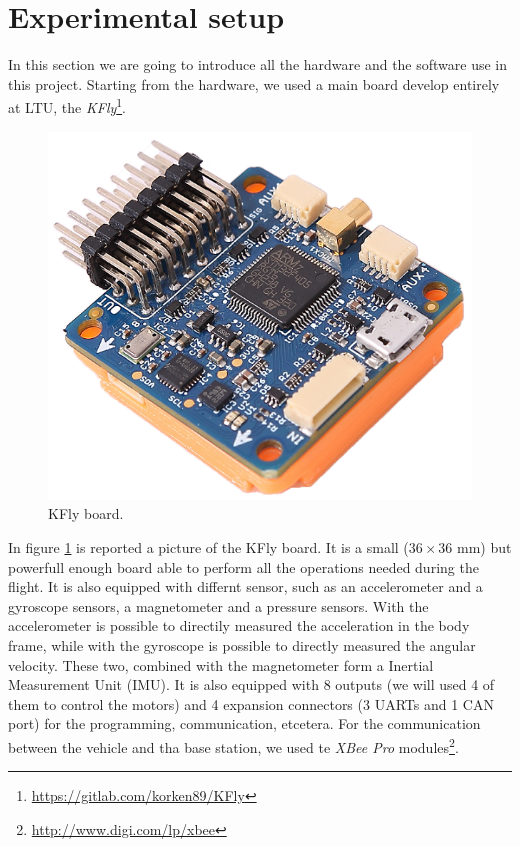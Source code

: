 \section{Experimental setup}

In this section we are going to introduce all the hardware and the software use in this project. Starting from the hardware, we used a main board develop entirely at LTU, the \textit{KFly}\footnote{\url{https://gitlab.com/korken89/KFly}}. 

\begin{figure}[h] 
	\centering
   	\includegraphics[scale = 0.4]{./images/KFly.png}
   	\caption{KFly board.}
   	\label{fig:KFly}
\end{figure} 

\noindent In figure \ref{fig:KFly} is reported a picture of the KFly board. It is a small ($36\times 36$ mm) but powerfull enough board able to perform all the operations needed during the flight. It is also equipped with differnt sensor, such as an accelerometer and a gyroscope sensors, a magnetometer and a pressure sensors. With the accelerometer is possible to directily measured the acceleration in the body frame, while with the gyroscope is possible to directly measured the angular velocity. These two, combined with the magnetometer form a Inertial Measurement Unit (IMU). It is also equipped with 8 outputs (we will used 4 of them to control the motors) and 4 expansion connectors (3 UARTs and 1 CAN port) for the programming, communication, etcetera. For the communication between the vehicle and tha base station, we used te \textit{XBee Pro} modules\footnote{\url{http://www.digi.com/lp/xbee}}.

